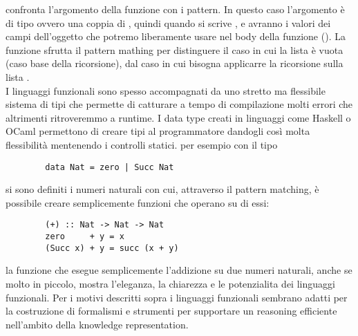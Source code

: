      confronta l'argomento della funzione con i pattern. In questo caso l'argomento è di tipo  ovvero
    una coppia di , quindi quando si scrive ,  e  avranno i valori dei campi dell'oggetto 
    che potremo liberamente usare nel body della funzione ().
    La funzione  sfrutta il pattern mathing per distinguere il caso in cui la lista è vuota  (caso base della ricorsione), dal caso in cui
    bisogna applicarre la ricorsione sulla lista . 
    \\I linguaggi funzionali sono spesso accompagnati da uno stretto ma flessibile sistema di tipi
    che permette di catturare a tempo di compilazione molti errori che altrimenti ritroveremmo a runtime. I data type creati in linguaggi come Haskell o OCaml
    permettono di creare tipi al programmatore dandogli così molta flessibilità mentenendo i controlli statici. per esempio con il tipo 
    \begin{verbatim}
        data Nat = zero | Succ Nat
    \end{verbatim}
    si sono definiti i numeri naturali con cui, attraverso il pattern matching, è possibile creare semplicemente funzioni che operano su di essi:
    \begin{verbatim}
        (+) :: Nat -> Nat -> Nat
        zero     + y = x
        (Succ x) + y = succ (x + y) 
    \end{verbatim}
    la funzione \code{(+)} che esegue semplicemente l'addizione su due numeri naturali, anche se molto in piccolo, mostra l'eleganza, la chiarezza e le potenzialita dei linguaggi funzionali.
    Per i motivi descritti sopra i linguaggi funzionali sembrano adatti per la costruzione di formalismi e strumenti per supportare un reasoning efficiente
    nell'ambito della knowledge representation.